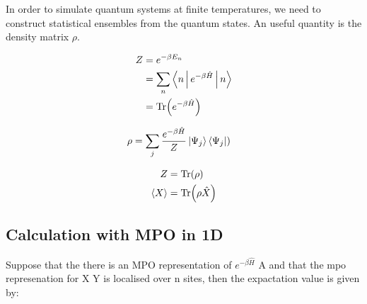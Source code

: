 In order to simulate quantum systems at finite temperatures, we need to construct statistical ensembles from the quantum states. An useful quantity is the density matrix $\rho$.


\begin{equation}
    \begin{split}
        Z &= e^{ - \beta E_n} \\
          &= \sum_n \Braket{n | e^{ - \beta \hat{H} }  | n} \\
          &= \Tr( e^{ - \beta \hat{H} } )
    \end{split}
\end{equation}

\begin{equation}
    \begin{split}
        \rho &= \sum_j \frac{ e^{ - \beta \hat{H} } }{Z}  \Ket{ \Psi_j} \Bra{\Psi_j} )   
    \end{split}
\end{equation}

\begin{equation}
    \begin{split}
        Z &= \Tr( \rho) \\
        \Braket{X} &= \Tr(\rho \hat{X})
    \end{split}
\end{equation}


\subsection{Calculation with MPO in 1D}

Suppose that the there is an MPO representation of $ e^{ - \beta \hat{H} } $ A and that the mpo represenation for X Y is localised over n sites, then the expactation value is given by:

